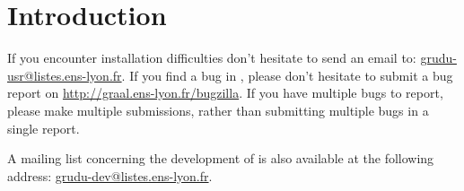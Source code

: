 
\chapter{Introduction}

If you encounter installation difficulties don't hesitate to send an
email to: \url{grudu-usr@listes.ens-lyon.fr}.  If you find a bug in \grudu, please
don't hesitate to submit a bug report on
\url{http://graal.ens-lyon.fr/bugzilla}. If you have multiple bugs to
report, please make multiple submissions, rather than submitting
multiple bugs in a single report.

A mailing list concerning the development of \grudu is also available at the
following address: \url{grudu-dev@listes.ens-lyon.fr}.


